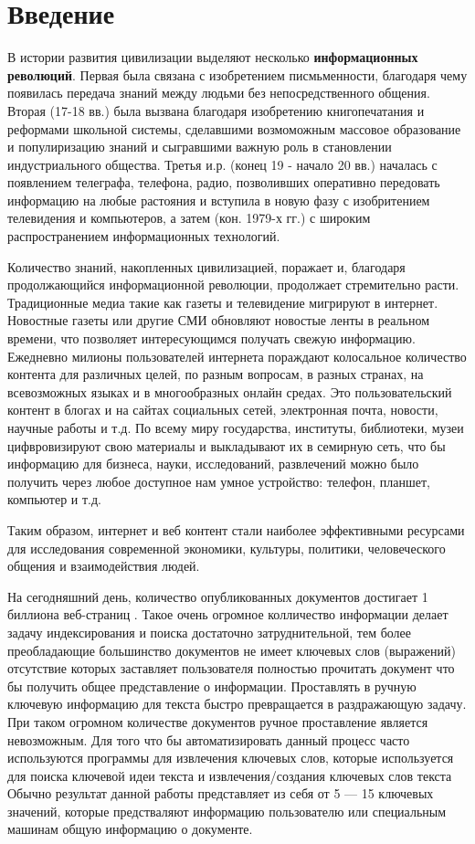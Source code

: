 \section{Введение}
В истории развития цивилизации выделяют несколько \textbf{информационных революций}.
Первая была связана с изобретением писмьменности, благодаря чему появилась передача знаний между людьми без непосредственного общения.
Вторая (17-18 вв.) была вызвана благодаря изобретению книгопечатания и реформами школьной системы, сделавшими возмоможным массовое образование и популиризацию знаний и сыгравшими важную роль в становлении индустриального общества.
Третья и.р. (конец 19 - начало 20 вв.) началась с появлением телеграфа, телефона, радио, позволивших оперативно передовать информацию на любые растояния и вступила в новую фазу с изобритением телевидения и компьютеров, а затем (кон. 1979-х гг.) с широким распространением информационных технологий. \cite{16}

Количество знаний, накопленных цивилизацией, поражает и, благодаря продолжающийся информационной революции, продолжает стремительно расти.
Традиционные медиа такие как газеты и телевидение мигрируют в интернет.
Новостные газеты или другие СМИ обновляют новостые ленты в реальном времени, что позволяет интересующимся получать свежую информацию.
Ежедневно милионы пользователей интернета пораждают колосальное количество контента для различных целей, по разным вопросам, в разных странах, на всевозможных языках и в многообразных онлайн средах.
Это пользовательский контент в блогах и на сайтах социальных сетей, электронная почта, новости, научные работы и т.д.
По всему миру государства, институты, библиотеки, музеи цифвровизируют свою материалы и выкладывают их в семирную сеть, что бы информацию для бизнеса, науки, исследований, развлечений можно было получить через любое доступное нам умное устройство: телефон, планшет, компьютер и т.д. \cite{2}

Таким образом, интернет и веб контент стали наиболее эффективными ресурсами для исследования современной экономики, культуры, политики, человеческого общения и взаимодействия людей. \cite{2}

На сегодняшний день, количество опубликованных документов достигает 1 биллиона веб-страниц \cite{1}. 
Такое очень огромное колличество информации делает задачу индексирования и поиска достаточно затруднительной, тем более преобладающие большинство документов не имеет ключевых слов (выражений) отсутствие которых заставляет пользователя полностью прочитать документ что бы получить общее представление о информации.
Проставлять в ручную ключевую информацию для текста быстро превращается в раздражающую задачу. 
При таком огромном количестве документов ручное проставление является невозможным. 
Для того что бы автоматизировать данный процесс часто используются программы для извлечения ключевых слов, которые используется для поиска ключевой идеи текста и извлечения/создания ключевых слов текста
Обычно результат данной работы представляет из себя от 5 — 15 ключевых значений, которые предстваляют информацию пользователю или специальным машинам общую информацию о документе.